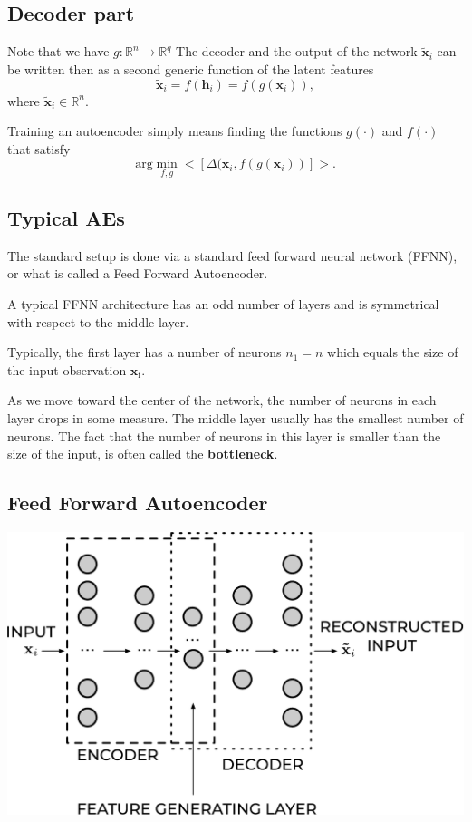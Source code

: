 \documentclass[%
oneside,                 %
final,                   %
10pt]{article}
\begin{document}
\subsection{Decoder part}

Note that we have $g:\mathbb{R}^{n}\rightarrow\mathbb{R}^{q}$
The decoder and the output of the network $\tilde{\mathbf{x}}_{i}$ can be written then as a second generic function
of the latent features
\[
\tilde{\mathbf{x}}_{i} = f\left(\mathbf{h}_{i}\right) = f\left(g\left(\mathbf{x}_{i}\right)\right),
\]
where $\tilde{\mathbf{x}}_{i}\mathbf{\in }\mathbb{R}^{n}$.

Training an autoencoder simply means finding the functions $g(\cdot)$ and $f(\cdot)$
that satisfy
\[
\textrm{arg}\min_{f,g}<\left[\Delta (\mathbf{x}_{i}, f(g\left(\mathbf{x}_{i}\right))\right]>.
\]

\subsection{Typical AEs}

The standard setup is done via a standard feed forward neural network (FFNN), or what is called a Feed Forward Autoencoder.

A typical FFNN architecture has an odd number of layers and is symmetrical with respect to the middle layer.

Typically, the first layer has a number of neurons $n_{1} = n$ which equals the size of the input observation $\mathbf{x}_{\mathbf{i}}$.

As we move toward the center of the network, the number of neurons in each layer drops in some measure.
The middle layer usually has the smallest number of neurons.
The fact that the number of neurons in this layer is smaller than the size of the input, is often called the \textbf{bottleneck}.

\subsection{Feed Forward Autoencoder}

\vspace{6mm}

\centerline{\includegraphics[width=1.0\linewidth]{figures/ae2.pdf}}
\end{document}
